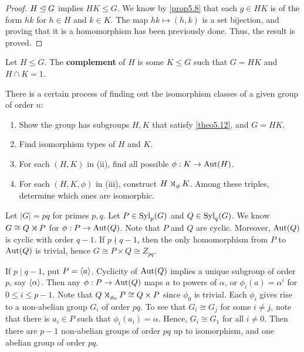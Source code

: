 \begin{proof}
    $H \trianglelefteq G$ implies $HK \leq G$. We know by \autoref{prop5.8} that each $g \in HK$ is of the form $hk$ for $h \in H$ and $k \in K$. The map $hk \mapsto (h, k)$ is a set bijection, and proving that it is a homomorphism has been previously done. Thus, the result is proved.
\end{proof}

 Let $H \leq G$. The \textbf{complement} of $H$ is some $K \leq G$ such that $G = HK$ and $H \cap K = 1$.

\note There is a certain process of finding out the isomorphism classes of a given group of order $n$:
\begin{enumerate}
    \item Show the group has subgroups $H, K$ that satisfy \autoref{theo5.12}, and $G = HK$.
    \item Find isomorphism types of $H$ and $K$.
    \item For each $(H, K)$ in (ii), find all possible $\phi : K \to \operatorname{Aut}(H)$.
    \item For each $(H, K, \phi)$ in (iii), construct $H \semidir_\phi K$. Among these triples, determine which ones are isomorphic.
\end{enumerate}

\ex Let $|G| = pq$ for primes $p, q$. Let $P \in \operatorname{Syl}_p(G)$ and $Q \in \operatorname{Syl}_q(G)$. We know $G \cong Q \semidir P$ for $\phi : P \to \operatorname{Aut}(Q)$. Note that $P$ and $Q$ are cyclic. Moreover, $\operatorname{Aut}(Q)$ is cyclic with order $q - 1$. If $p \nmid q - 1$, then the only homomorphism from $P$ to $\operatorname{Aut}(Q)$ is trivial, hence $G \cong P \times Q \cong Z_{pq}$.

If $p \mid q - 1$, put $P = \langle a\rangle$. Cyclicity of $\operatorname{Aut}(Q)$ implies a unique subgroup of order $p$, say $\langle\alpha\rangle$. Then any $\phi : P \to \operatorname{Aut}(Q)$ maps $a$ to powers of $\alpha$, or $\phi_i(a) = \alpha^i$ for $0 \leq i \leq p - 1$. Note that $Q \semidir_{\phi_0} P \cong Q \times P$ since $\phi_0$ is trivial. Each $\phi_i$ gives rise to a non-abelian group $G_i$ of order $pq$. To see that $G_i \cong G_j$ for some $i \neq j$, note that there is $a_i \in P$ such that $\phi_i(a_i) = \alpha$. Hence, $G_i \cong G_1$ for all $i \neq 0$. Then there are $p - 1$ non-abelian groups of order $pq$ up to isomorphism, and one abelian group of order $pq$.

